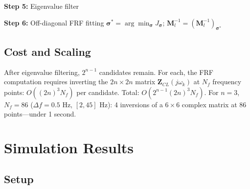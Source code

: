 \documentclass[10pt,twocolumn]{article}
\begin{document}
\begin{algorithm}[t]
\caption{Signed Inertia Matrix via Off-Diagonal FRF Fitting}
\label{alg:main}

\textbf{Step 5:} Eigenvalue filter\;

\textbf{Step 6:} Off-diagonal FRF fitting\;
\Return $\bm{\sigma}^* = \arg\min_{\bm{\sigma}} J_{\bm{\sigma}}$; \quad $\bm{M}_l^{-1} = (\bm{M}_l^{-1})_{\bm{\sigma}^*}$\;
\end{algorithm}

\subsection{Cost and Scaling}

After eigenvalue filtering, $2^{n-1}$ candidates remain. For each, the FRF computation requires inverting the $2n \times 2n$ matrix $\bm{Z}_{CL}(j\omega_k)$ at $N_f$ frequency points: $O((2n)^3 N_f)$ per candidate. Total: $O(2^{n-1} (2n)^3 N_f)$. For $n=3$, $N_f=86$ ($\Delta f=0.5$ Hz, $[2,45]$ Hz): 4 inversions of a $6\times 6$ complex matrix at 86 points---under 1 second.

\section{Simulation Results}

\subsection{Setup}
\end{document}
